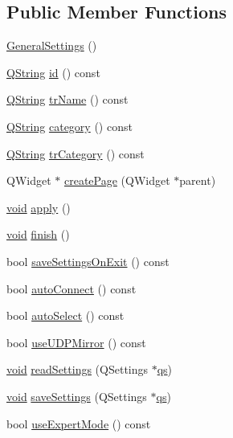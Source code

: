 \subsection*{Public Member Functions}
\begin{DoxyCompactItemize}
\item 
\hyperlink{group___core_plugin_ga7cf4f02d76f5d9db7a232c81277d651d}{General\-Settings} ()
\item 
\hyperlink{group___u_a_v_objects_plugin_gab9d252f49c333c94a72f97ce3105a32d}{Q\-String} \hyperlink{group___core_plugin_ga8bb51f57d191b5d45c620c51ba0a86ce}{id} () const 
\item 
\hyperlink{group___u_a_v_objects_plugin_gab9d252f49c333c94a72f97ce3105a32d}{Q\-String} \hyperlink{group___core_plugin_ga683217bd4278a43c5da4ae02f496e4be}{tr\-Name} () const 
\item 
\hyperlink{group___u_a_v_objects_plugin_gab9d252f49c333c94a72f97ce3105a32d}{Q\-String} \hyperlink{group___core_plugin_ga67f6407f4ec5011b0c68ebaf67ebb0d3}{category} () const 
\item 
\hyperlink{group___u_a_v_objects_plugin_gab9d252f49c333c94a72f97ce3105a32d}{Q\-String} \hyperlink{group___core_plugin_ga58870a0e7f11e7805de16107c84770aa}{tr\-Category} () const 
\item 
Q\-Widget $\ast$ \hyperlink{group___core_plugin_gaeb7677694f5ab09b007ae9e1ac8e42f4}{create\-Page} (Q\-Widget $\ast$parent)
\item 
\hyperlink{group___u_a_v_objects_plugin_ga444cf2ff3f0ecbe028adce838d373f5c}{void} \hyperlink{group___core_plugin_gae3a2e41db792dbde563be705654d76ee}{apply} ()
\item 
\hyperlink{group___u_a_v_objects_plugin_ga444cf2ff3f0ecbe028adce838d373f5c}{void} \hyperlink{group___core_plugin_ga784c83abdb7e5367a532ac684bc89c11}{finish} ()
\item 
bool \hyperlink{group___core_plugin_ga045865ac578d53e8a8aca9e8c1e034a8}{save\-Settings\-On\-Exit} () const 
\item 
bool \hyperlink{group___core_plugin_ga5416b64c1586447c9969590a9bd2f0c2}{auto\-Connect} () const 
\item 
bool \hyperlink{group___core_plugin_ga8a3ceff3840ac587a0e118c174fbea7e}{auto\-Select} () const 
\item 
bool \hyperlink{group___core_plugin_ga90989a592d1a849b628a7108bf4ec9ed}{use\-U\-D\-P\-Mirror} () const 
\item 
\hyperlink{group___u_a_v_objects_plugin_ga444cf2ff3f0ecbe028adce838d373f5c}{void} \hyperlink{group___core_plugin_gad9782b056c9573b858d82ce59218a44e}{read\-Settings} (Q\-Settings $\ast$\hyperlink{analyze_i_n_s_g_p_s_8m_a620a138c8981e0536c569d7761df4548}{qs})
\item 
\hyperlink{group___u_a_v_objects_plugin_ga444cf2ff3f0ecbe028adce838d373f5c}{void} \hyperlink{group___core_plugin_gaa1e79ec44fa23eff837ff6fa6cc50385}{save\-Settings} (Q\-Settings $\ast$\hyperlink{analyze_i_n_s_g_p_s_8m_a620a138c8981e0536c569d7761df4548}{qs})
\item 
bool \hyperlink{group___core_plugin_ga264b9f5010a2928592a8175416a25f47}{use\-Expert\-Mode} () const 
\end{DoxyCompactItemize}


